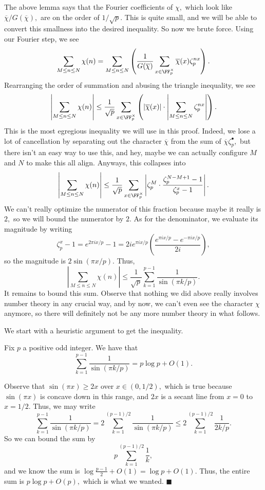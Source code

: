 The above lemma says that the Fourier coefficients of $\chi,$ which look like $\overline\chi/G(\overline\chi),$ are on the order of $1/\sqrt p.$ This is quite small, and we will be able to convert this smallness into the desired inequality. So now we brute force. Using our Fourier step, we see
\[\sum_{M\le n\le N}\chi(n)=\sum_{M\le n\le N}\left(\frac1{G(\overline\chi)}\sum_{x\in\FF_p^\times}\overline\chi(x)\zeta_p^{nx}\right).\]
Rearranging the order of summation and abusing the triangle inequality, we see
\[\left|\sum_{M\le n\le N}\chi(n)\right|\le\frac1{\sqrt p}\sum_{x\in\FF_p^\times}\left(|\overline\chi(x)|\cdot\left|\sum_{M\le n\le N}\zeta_p^{nx}\right|\right).\]
This is the most egregious inequality we will use in this proof. Indeed, we lose a lot of cancellation by separating out the character $\overline\chi$ from the sum of $\overline\chi\zeta_p^\bullet,$ but there isn't an easy way to use this, and hey, maybe we can actually configure $M$ and $N$ to make this all align. Anyways, this collapses into
\[\left|\sum_{M\le n\le N}\chi(n)\right|\le\frac1{\sqrt p}\sum_{x\in\FF_p^\times}\left|\zeta_p^M\cdot\frac{\zeta_p^{N-M+1}-1}{\zeta_p^x-1}\right|.\]
We can't really optimize the numerator of this fraction because maybe it really is $2,$ so we will bound the numerator by $2.$ As for the denominator, we evaluate its magnitude by writing
\[\zeta_p^x-1=e^{2\pi ix/p}-1=2ie^{\pi ix/p}\left(\frac{e^{\pi ix/p}-e^{-\pi ix/p}}{2i}\right),\]
so the magnitude is $2\sin(\pi x/p).$ Thus,
\[\left|\sum_{M\le n\le N}\chi(n)\right|\le\frac1{\sqrt p}\sum_{k=1}^{p-1}\frac1{\sin(\pi k/p)}.\]
It remains to bound this sum. Observe that nothing we did above really involves number theory in any crucial way, and by now, we can't even see the character $\chi$ anymore, so there will definitely not be any more number theory in what follows.

We start with a heuristic argument to get the inequality.
\begin{lemma}
    Fix $p$ a positive odd integer. We have that
    \[\sum_{k=1}^{p-1}\frac1{\sin(\pi k/p)}=p\log p+O(1).\]
\end{lemma}
Observe that $\sin(\pi x)\ge2x$ over $x\in(0,1/2),$ which is true because $\sin(\pi x)$ is concave down in this range, and $2x$ is a secant line from $x=0$ to $x=1/2.$ Thus, we may write
\[\sum_{k=1}^{p-1}\frac1{\sin(\pi k/p)}=2\sum_{k=1}^{(p-1)/2}\frac1{\sin(\pi k/p)}\le2\sum_{k=1}^{(p-1)/2}\frac1{2k/p}.\]
So we can bound the sum by
\[p\sum_{k=1}^{(p-1)/2}\frac1k,\]
and we know the sum is $\log\frac{p-1}2+O(1)=\log p+O(1).$ Thus, the entire sum is $p\log p+O(p),$ which is what we wanted. $\blacksquare$

